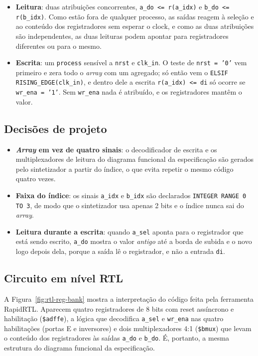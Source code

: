 \begin{itemize}
  \item \textbf{Leitura}: duas atribuições concorrentes, \texttt{a\_do <= r(a\_idx)} e \texttt{b\_do <= r(b\_idx)}. Como estão fora de qualquer processo, as saídas reagem à seleção e ao conteúdo dos registradores sem esperar o clock, e como as duas atribuições são independentes, as duas leituras podem apontar para registradores diferentes ou para o mesmo.
  \item \textbf{Escrita}: um \texttt{process} sensível a \texttt{nrst} e \texttt{clk\_in}. O teste de \texttt{nrst = '0'} vem primeiro e zera todo o \textit{array} com um agregado; só então vem o \texttt{ELSIF RISING\_EDGE(clk\_in)}, e dentro dele a escrita \texttt{r(a\_idx) <= di} só ocorre se \texttt{wr\_ena = '1'}. Sem \texttt{wr\_ena} nada é atribuído, e os registradores mantêm o valor.
\end{itemize}

\subsection{Decisões de projeto}

\begin{itemize}
  \item \textbf{\textit{Array} em vez de quatro sinais}: o decodificador de escrita e os multiplexadores de leitura do diagrama funcional da especificação são gerados pelo sintetizador a partir do índice, o que evita repetir o mesmo código quatro vezes.
  \item \textbf{Faixa do índice}: os sinais \texttt{a\_idx} e \texttt{b\_idx} são declarados \texttt{INTEGER RANGE 0 TO 3}, de modo que o sintetizador usa apenas 2 bits e o índice nunca sai do \textit{array}.
  \item \textbf{Leitura durante a escrita}: quando \texttt{a\_sel} aponta para o registrador que está sendo escrito, \texttt{a\_do} mostra o valor \textit{antigo} até a borda de subida e o novo logo depois dela, porque a saída lê o registrador, e não a entrada \texttt{di}.
\end{itemize}

\subsection{Circuito em nível RTL}

A Figura~\ref{fig:rtl-reg-bank} mostra a interpretação do código feita pela ferramenta RapidRTL. Aparecem quatro registradores de 8 bits com reset assíncrono e habilitação (\texttt{\$adffe}), a lógica que decodifica \texttt{a\_sel} e \texttt{wr\_ena} nas quatro habilitações (portas E e inversores) e dois multiplexadores 4:1 (\texttt{\$bmux}) que levam o conteúdo dos registradores às saídas \texttt{a\_do} e \texttt{b\_do}. É, portanto, a mesma estrutura do diagrama funcional da especificação.


